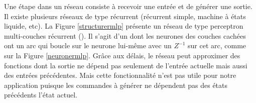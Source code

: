 Une étape dans un réseau consiste à recevoir une entrée et de générer une sortie.
Il existe plusieurs réseaux de type récurrent (récurrent simple, machine à états liquide, etc).
La Figure \ref{structurermlp} présente un réseau de type perceptron multi-couches récurrent (\rmlp).
Il s'agit d'un \mlp dont les neurones des couches cachées ont un arc qui boucle sur le neurone lui-même avec un $Z^{-1}$ sur cet arc, comme sur la Figure \ref{neuronermlp}.
Grâce aux délais, le réseau peut approximer des fonctions dont la sortie ne dépend pas seulement de l'entrée actuelle mais aussi des entrées précédentes.
Mais cette fonctionnalité n'est pas utile pour notre application puisque les commandes à générer ne dépendent pas des états précédents l'état actuel.
